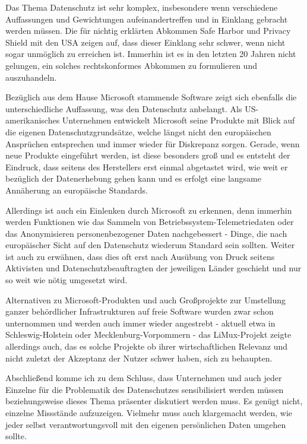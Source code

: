 Das Thema Datenschutz ist sehr komplex, insbesondere wenn verschiedene Auffassungen und Gewichtungen aufeinandertreffen und in Einklang gebracht werden müssen. Die für nichtig erklärten Abkommen \glqq Safe Harbor\grqq{} und \glqq Privacy Shield\grqq{} mit den USA zeigen auf, dass dieser Einklang sehr schwer, wenn nicht sogar unmöglich zu erreichen ist. Immerhin ist es in den letzten 20 Jahren nicht gelungen, ein solches rechtskonformes Abkommen zu formulieren und auszuhandeln.

Bezüglich aus dem Hause Microsoft stammende Software zeigt sich ebenfalls die unterschiedliche Auffassung, was den Datenschutz anbelangt. Als US-amerikanisches Unternehmen entwickelt Microsoft seine Produkte mit Blick auf die eigenen Datenschutzgrundsätze, welche längst nicht den europäischen Ansprüchen entsprechen und immer wieder für Diskrepanz sorgen. Gerade, wenn neue Produkte eingeführt werden, ist diese besonders groß und es entsteht der Eindruck, dass seitens des Herstellers erst einmal abgetastet wird, wie weit er bezüglich der Datenerhebung gehen kann und es erfolgt eine langsame Annäherung an europäische Standards.

Allerdings ist auch ein Einlenken durch Microsoft zu erkennen, denn immerhin werden Funktionen wie das Sammeln von Betriebssystem-Telemetriedaten oder das Anonymisieren personenbezogener Daten nachgebessert - Dinge, die nach europäischer Sicht auf den Datenschutz wiederum Standard sein sollten. Weiter ist auch zu erwähnen, dass dies oft erst nach Ausübung von Druck seitens Aktivisten und Datenschutzbeauftragten der jeweiligen Länder geschieht und nur so weit wie nötig umgesetzt wird.

Alternativen zu Microsoft-Produkten und auch Großprojekte zur Umstellung ganzer behördlicher Infrastrukturen auf freie Software wurden zwar schon unternommen und werden auch immer wieder angestrebt - aktuell etwa in Schleswig-Holstein oder Mecklenburg-Vorpommern - das LiMux-Projekt zeigte allerdings auch, das es solche Projekte ob ihrer wirtschaftlichen Relevanz und nicht zuletzt der Akzeptanz der Nutzer schwer haben, sich zu behaupten.

Abschließend komme ich zu dem Schluss, dass Unternehmen und auch jeder Einzelne für die Problematik des Datenschutzes sensibilisiert werden müssen beziehungsweise dieses Thema präsenter diskutiert werden muss. Es genügt nicht, einzelne Missstände aufzuzeigen. Vielmehr muss auch klargemacht werden, wie jeder selbst verantwortungsvoll mit den eigenen persönlichen Daten umgehen sollte.
\\